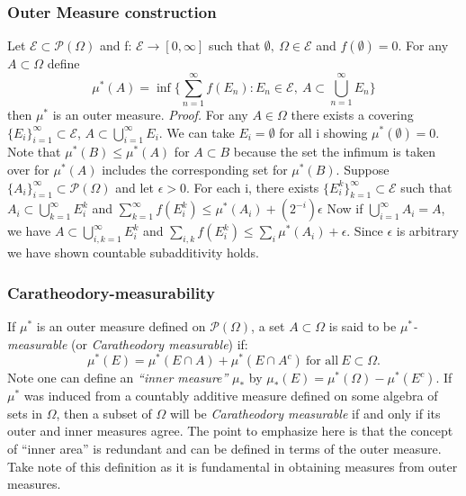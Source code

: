 \documentclass{article}
\begin{document}
\subsubsection{Outer Measure construction}
Let $\mathcal{E} \subset\mathcal{P}(\Omega)$ and f: $\mathcal{E} \to [0,\infty]$ such that $\emptyset, \ \Omega\in\mathcal{E}$ and $f(\emptyset)=0$. For any $A\subset \Omega$ define 
\[
\mu^*(A)=\inf \{\sum_{n=1}^{\infty}f(E_n): E_n \in \mathcal{E}, \ A\subset \bigcup_{n=1}^{\infty}E_n\}
\]
then $\mu^*$ is an outer measure.
\newline \newline
\textit{Proof.}\newline \newline
For any $A \in \Omega$ there exists a covering $\{E_i\}_{i=1}^{\infty}\subset \mathcal{E}$, $A\subset\bigcup_{i=1}^{\infty}E_i.$ We can take $E_i=\emptyset$ for all i showing $\mu^*(\emptyset) = 0$. Note that $\mu^*(B)\leq\mu^*(A)$ for $A\subset B$ because the set the infimum is taken over for $\mu^*(A)$ includes the corresponding set for $\mu^*(B)$. \newline \newline
Suppose $\{A_i\}_{i=1}^{\infty} \subset \mathcal{P}(\Omega)$ and let $\epsilon>0$. For each i, there exists $\{E_i^k\}_{k=1}^{\infty} \subset \mathcal{E}$ such that $A_i \subset \bigcup_{k=1}^{\infty}E^k_i$ and $\sum_{k=1}^{\infty}f(E^k_i) \leq \mu^*(A_i)+(2^{-i})\epsilon$ \newline \newline
Now if $\bigcup_{i=1}^{\infty}A_i=A$, we have $A\subset\bigcup_{i,k=1}^{\infty}E^k_i$ and $\sum_{i,k}f(E^k_i)\leq\sum_i\mu^*(A_i) +\epsilon$. Since $\epsilon$ is arbitrary we have shown countable subadditivity holds.

\subsubsection{Caratheodory-measurability}
If $\mu^*$ is an outer measure defined on $\mathcal{P}(\Omega)$, a set $A\subset \Omega$ is said to be \emph{$\mu^*$-measurable} (or \emph{Caratheodory measurable}) if:
\[
\mu^*(E) = \mu^*(E\cap A)+\mu^*(E\cap A^c) \ \text{for all} \ E \subset \Omega.
\]
Note one can define an \emph{``inner measure''} $\mu_*$ by $\mu_*(E)=\mu^*(\Omega)-\mu^*(E^c)$. If $\mu^*$ was induced from a countably additive measure defined on some algebra of sets in $\Omega$, then a subset of $\Omega$ will be \emph{Caratheodory measurable} if and only if its outer and inner measures agree.
\newline \newline 
The point to emphasize here is that the concept of ``inner area'' is redundant and can be defined in terms of the outer measure. Take note of this definition as it is fundamental in obtaining measures from outer measures.
\end{document}
